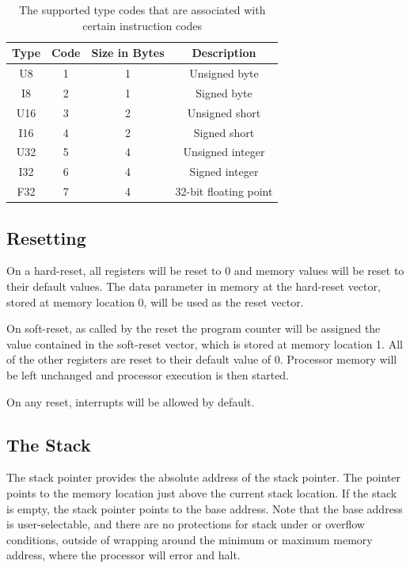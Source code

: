\documentclass{article}
\begin{document}
\begin{table}[h!]
	\centering
	\begin{tabular}{c|cc|c}
		\hline
		Type & Code & Size in Bytes & Description \\
		\hline
		 U8 & 1 & 1 & Unsigned byte \\
		 I8 & 2 & 1 & Signed byte \\
		 U16 & 3 & 2 & Unsigned short\\
		 I16 & 4 & 2 & Signed short \\
		 U32 & 5 & 4 & Unsigned integer \\
		 I32 & 6 & 4 & Signed integer \\
		 F32 & 7 & 4 & 32-bit floating point \\
		\hline
	\end{tabular}
	\caption{The supported type codes that are associated with certain instruction codes}
	\label{table:type-codes}
\end{table}

\subsection{Resetting}

On a hard-reset, all registers will be reset to 0 and memory values will be reset to their default values. The data parameter in memory at the hard-reset vector, stored at memory location 0, will be used as the reset vector.

On soft-reset, as called by the reset the program counter will be assigned the value contained in the soft-reset vector, which is stored at memory location 1. All of the other registers are reset to their default value of 0. Processor memory will be left unchanged and processor execution is then started.

On any reset, interrupts will be allowed by default.

\subsection{The Stack}
\label{sec:the-stack}

The stack pointer provides the absolute address of the stack pointer. The pointer points to the memory location just above the current stack location. If the stack is empty, the stack pointer points to the base address. Note that the base address is user-selectable, and there are no protections for stack under or overflow conditions, outside of wrapping around the minimum or maximum memory address, where the processor will error and halt.
\end{document}
